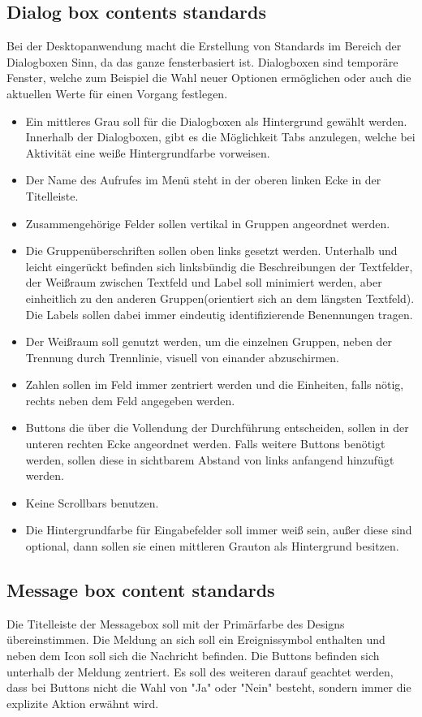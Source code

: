 \subsection{Dialog box contents standards}
Bei der Desktopanwendung macht die Erstellung von Standards im Bereich der Dialogboxen Sinn, da das ganze fensterbasiert ist. Dialogboxen sind temporäre Fenster, welche zum Beispiel die Wahl neuer Optionen ermöglichen oder auch die aktuellen Werte für einen Vorgang festlegen.

\begin{itemize}
\item Ein mittleres Grau soll für die Dialogboxen als Hintergrund gewählt werden. Innerhalb der Dialogboxen, gibt es die Möglichkeit Tabs anzulegen, welche bei Aktivität eine weiße Hintergrundfarbe vorweisen. 
\item Der Name des Aufrufes im Menü steht in der oberen linken Ecke in der Titelleiste.
\item Zusammengehörige Felder sollen vertikal in Gruppen angeordnet werden.
\item Die Gruppenüberschriften sollen oben links gesetzt werden. Unterhalb und leicht eingerückt befinden sich linksbündig die Beschreibungen der Textfelder, der Weißraum zwischen Textfeld und Label soll minimiert werden, aber einheitlich zu den anderen Gruppen(orientiert sich an dem längsten Textfeld). Die Labels sollen dabei immer eindeutig identifizierende Benennungen tragen.
\item Der Weißraum soll genutzt werden, um die einzelnen Gruppen, neben der Trennung durch Trennlinie, visuell von einander abzuschirmen.
\item Zahlen sollen im Feld immer zentriert werden und die Einheiten, falls nötig, rechts neben dem Feld angegeben werden.
\item Buttons die über die Vollendung der Durchführung entscheiden, sollen in der unteren rechten Ecke angeordnet werden. Falls weitere Buttons benötigt werden, sollen diese in sichtbarem Abstand von links anfangend hinzufügt werden.
\item Keine Scrollbars benutzen.
\item Die Hintergrundfarbe für Eingabefelder soll immer weiß sein, außer diese sind optional, dann sollen sie einen mittleren Grauton als Hintergrund besitzen.  
\end{itemize}

\subsection{Message box content standards}
Die Titelleiste der Messagebox soll mit der Primärfarbe des Designs übereinstimmen. Die Meldung an sich soll ein Ereignissymbol enthalten und neben dem Icon soll sich die Nachricht befinden. Die Buttons befinden sich unterhalb der Meldung zentriert. Es soll des weiteren darauf geachtet werden, dass bei Buttons nicht die Wahl von "Ja" oder "Nein" besteht, sondern immer die explizite Aktion erwähnt wird. 

